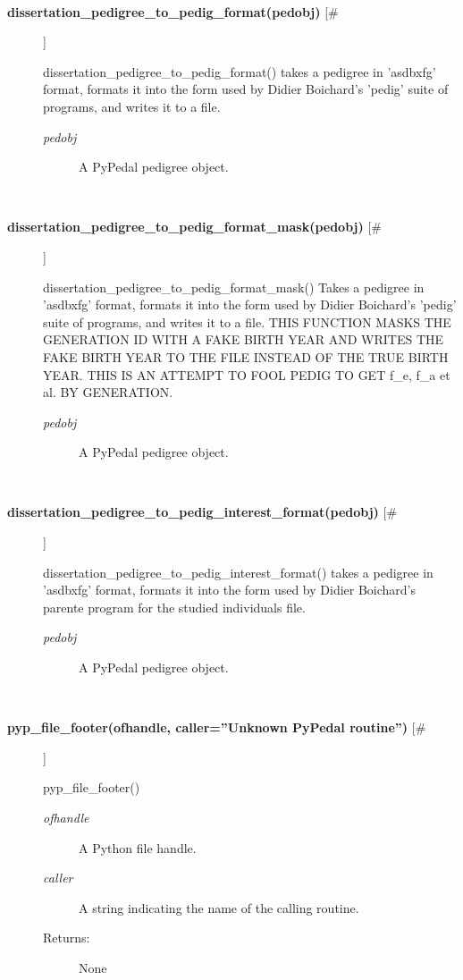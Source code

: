 \documentclass[10pt]{article}
\begin{document}
\begin{description}
\begin{description}
\end{description}
\\ 

\item[\textbf{dissertation\_pedigree\_to\_pedig\_format(pedobj)}
 [\#]]

 dissertation\_pedigree\_to\_pedig\_format() takes a pedigree in 'asdbxfg' format, formats it into the form used by Didier Boichard's 'pedig' suite of programs, and writes it to a file.
\begin{description}
\item[\emph{pedobj}
] A PyPedal pedigree object.

\end{description}
\\ 

\item[\textbf{dissertation\_pedigree\_to\_pedig\_format\_mask(pedobj)}
 [\#]]

 dissertation\_pedigree\_to\_pedig\_format\_mask() Takes a pedigree in 'asdbxfg' format, formats it into the form used by Didier Boichard's 'pedig' suite of programs, and writes it to a file. THIS FUNCTION MASKS THE GENERATION ID WITH A FAKE BIRTH YEAR AND WRITES THE FAKE BIRTH YEAR TO THE FILE INSTEAD OF THE TRUE BIRTH YEAR. THIS IS AN ATTEMPT TO FOOL PEDIG TO GET f\_e, f\_a et al. BY GENERATION.
\begin{description}
\item[\emph{pedobj}
] A PyPedal pedigree object.

\end{description}
\\ 

\item[\textbf{dissertation\_pedigree\_to\_pedig\_interest\_format(pedobj)}
 [\#]]

 dissertation\_pedigree\_to\_pedig\_interest\_format() takes a pedigree in 'asdbxfg' format, formats it into the form used by Didier Boichard's parente program for the studied individuals file.
\begin{description}
\item[\emph{pedobj}
] A PyPedal pedigree object.

\end{description}
\\ 

\item[\textbf{pyp\_file\_footer(ofhandle, caller=''Unknown PyPedal routine'')}
 [\#]]

 pyp\_file\_footer()
\begin{description}
\item[\emph{ofhandle}
] A Python file handle.
\item[\emph{caller}
] A string indicating the name of the calling routine.
\item[Returns:] None


\end{description}
\end{description}
\end{document}
